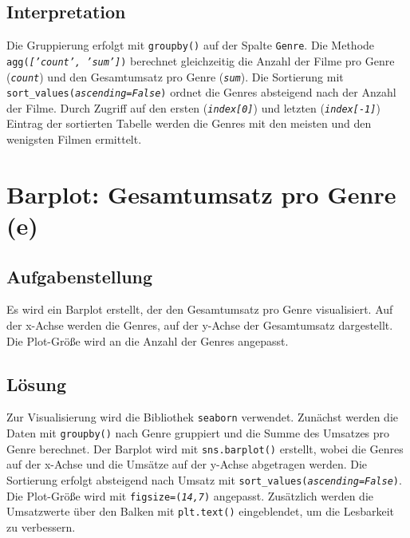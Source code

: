 \subsection{Interpretation}

Die Gruppierung erfolgt mit \texttt{groupby()} auf der Spalte \texttt{Genre}. Die Methode \texttt{agg(\textit{['count', 'sum']})} berechnet gleichzeitig die Anzahl der Filme pro Genre (\textit{\texttt{count}}) und den Gesamtumsatz pro Genre (\textit{\texttt{sum}}). Die Sortierung mit \texttt{sort\_values(\textit{ascending=False})} ordnet die Genres absteigend nach der Anzahl der Filme. Durch Zugriff auf den ersten (\textit{\texttt{index[0]}}) und letzten (\textit{\texttt{index[-1]}}) Eintrag der sortierten Tabelle werden die Genres mit den meisten und den wenigsten Filmen ermittelt.

\cleardoublepage


\section{Barplot: Gesamtumsatz pro Genre (e)}
\label{sec:1e}

\subsection{Aufgabenstellung}

Es wird ein Barplot erstellt, der den Gesamtumsatz pro Genre visualisiert. Auf der x-Achse werden die Genres, auf der y-Achse der Gesamtumsatz dargestellt. Die Plot-Größe wird an die Anzahl der Genres angepasst.

\subsection{Lösung}

Zur Visualisierung wird die Bibliothek \texttt{seaborn} verwendet. Zunächst werden die Daten mit \texttt{groupby()} nach Genre gruppiert und die Summe des Umsatzes pro Genre berechnet. Der Barplot wird mit \texttt{sns.barplot()} erstellt, wobei die Genres auf der x-Achse und die Umsätze auf der y-Achse abgetragen werden. Die Sortierung erfolgt absteigend nach Umsatz mit \texttt{sort\_values(\textit{ascending=False})}. Die Plot-Größe wird mit \texttt{figsize=(\textit{14,7})} angepasst. Zusätzlich werden die Umsatzwerte über den Balken mit \texttt{plt.text()} eingeblendet, um die Lesbarkeit zu verbessern.

